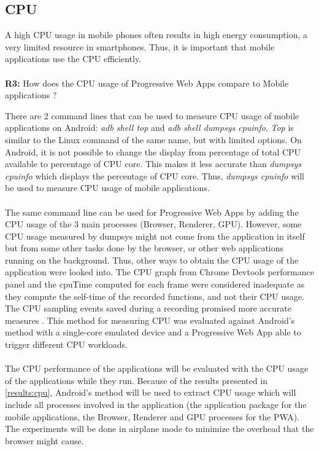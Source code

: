 \subsection{CPU}

A high CPU usage in mobile phones often results in high energy consumption, a very limited resource in smartphones. Thus, it is important that mobile applications use the CPU efficiently.

\paragraph{}
\textbf{R3:} How does the CPU usage of Progressive Web Apps compare to Mobile applications ?


There are 2 command lines that can be used to measure CPU usage of mobile applications on Android: \textit{adb shell top} and \textit{adb shell dumpsys cpuinfo}. \textit{Top} is similar to the Linux command of the same name, but with limited options. On Android, it is not possible to change the display from percentage of total CPU available to percentage of CPU core. This makes it less accurate than \textit{dumpsys cpuinfo} which displays the percentage of CPU core. Thus, \textit{dumpsys cpuinfo} will be used to measure CPU usage of mobile applications. 

\paragraph{}
The same command line can be used for Progressive Web Apps by adding the CPU usage of the 3 main processes (Browser, Renderer, GPU). 
However, some CPU usage measured by dumpsys might not come from the application in itself but from some other tasks done by the browser, or other web applications running on the background. 
Thus, other ways to obtain the CPU usage of the application were looked into.
The CPU graph from Chrome Devtools performance panel and the cpuTime computed for each frame were considered inadequate as they compute the self-time of the recorded functions, and not their CPU usage. The CPU sampling events saved during a recording promised more accurate measures \cite{cpu_sampling}. This method for measuring CPU was evaluated against Android's method with a single-core emulated device and a Progressive Web App able to trigger different CPU workloads. \newline

\paragraph{}
The CPU performance of the applications will be evaluated with the CPU usage of the applications while they run. Because of the results presented in \autoref{results:cpu}, Android's method will be used to extract CPU usage which will include all processes involved in the application (the application package for the mobile applications, the Browser, Renderer and GPU processes for the PWA). The experiments will be done in airplane mode to minimize the overhead that the browser might cause. 

